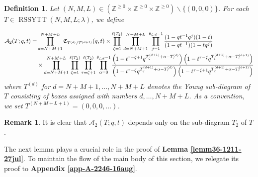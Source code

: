 \documentclass[12pt,reqno,a4paper]{amsart}
\newcommand{\cals}[1]{\mathcal{#1}}
\newcommand{\fraks}[1]{\mathfrak{#1}}
\newcommand{\bb}[1]{\mathbb{#1}}
\numberwithin{equation}{section}
\newtheorem{dfn}[thm]{Definition}
\theoremstyle{definition}
\newtheorem{rem}[thm]{Remark}
\begin{document}
\begin{dfn}
\label{dfn213-1508-1aug}
Let $(N,M,L) \in (\bb{Z}^{\geq 0} \times \bb{Z}^{\geq 0} \times \bb{Z}^{\geq 0})\backslash\{(0,0,0)\}$. For each $T \in \operatorname{RSSYTT}(N,M,L;\lambda)$, we define 

\footnotesize
\begin{align}
	\cals{A}_2(T;q,t)
	=& 
	\prod_{d = N+M+1}^{N+M+L}\fraks{C}_{T^{(d)}/T^{(d+1)}}(q,t)
	\times 
	\prod_{\zeta = 1}^{\ell(T_2)}
	\prod_{d = N+M+1}^{N+M+L}
	\prod_{j = 1}^{\theta_{\zeta,d} - 1}
	\frac{
		(1 - qt^{-1}q^{ j})(1 - t)
	}{
		(1 - qt^{-1})(1 - tq^{ j})
	}
	\\
	&\times
	\prod_{d = N+M+1}^{N+M+L} 
	\prod_{\zeta = 1}^{\ell(T_2)}
	\prod_{\tau = \zeta + 1}^{\ell(T_2)} 
	\prod_{\alpha = 0}^{\theta_{\zeta,d} - 1}
	\frac{
		\left(		1 - t^{\tau - \zeta + 1} q^{ T^{(d+1)}_{\zeta} + \alpha	 -	T^{(d)}_{\tau}			}					\right)
		\left(
		1 - t^{\tau - \zeta} q^{ T^{(d+1)}_{\zeta} + \alpha	-	T^{(d+1)}_{\tau}			}	
		\right)
	}{
		\left(
		1 - t^{\tau - \zeta} q^{ T^{(d+1)}_{\zeta} + \alpha	 -	T^{(d)}_{\tau} 		}	
		\right)
		\left(		1 - t^{\tau - \zeta + 1} q^{	T^{(d+1)}_{\zeta} + \alpha	 - T^{(d+1)}_{\tau}			}					\right)
	}
	\notag 
\end{align}
\normalsize
where $T^{(d)}$ for $d = N+M+1,\dots,N+M+L$ denotes the Young sub-diagram of $T$ consisting of boxes assigned with numbers $d,\dots,N+M+L$. As a convention, we set $T^{(N+M+L+1)} = (0,0,0,\dots)$. 
\end{dfn}

\begin{rem}
It is clear that $\cals{A}_2(T;q,t)$ depends only on the sub-diagram $T_2$ of $T$. 
\end{rem}

The next lemma plays a crucial role in the proof of \textbf{Lemma \ref{lemm36-1211-27jul}}. To maintain the flow of the main body of this section, we relegate its proof to \textbf{Appendix \ref{app-A-2246-16aug}}. 
\end{document}

